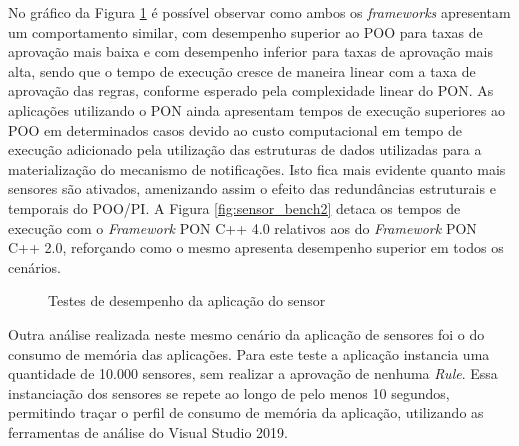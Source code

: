 No gráfico da Figura \ref{fig:sensor_bench} é possível observar como ambos os
\textit{frameworks} apresentam um comportamento similar, com desempenho superior
ao POO para taxas de aprovação mais baixa e com desempenho inferior para taxas
de aprovação mais alta, sendo que o tempo de execução cresce de maneira linear
com a taxa de aprovação das regras, conforme esperado pela complexidade linear
do PON. As aplicações utilizando o PON ainda apresentam tempos de execução
superiores ao POO em determinados casos devido ao custo computacional em tempo
de execução adicionado pela utilização das estruturas de dados utilizadas para a
materialização do mecanismo de notificações. Isto fica mais evidente quanto mais
sensores são ativados, amenizando assim o efeito das redundâncias estruturais e
temporais do POO/PI. A Figura \ref{fig:sensor_bench2} detaca os tempos de
execução com o \textit{Framework} PON C++ 4.0 relativos aos do
\textit{Framework} PON C++ 2.0, reforçando como o mesmo apresenta desempenho
superior em todos os cenários.

\begin{figure}[!htb]
\centering
{}
\caption{Testes de desempenho da aplicação do sensor}
\label{fig:sensor_bench}
\end{figure}

Outra análise realizada neste mesmo cenário da aplicação de sensores foi o do
consumo de memória das aplicações. Para este teste a aplicação instancia uma
quantidade de 10.000 sensores, sem realizar a aprovação de nenhuma \textit{Rule}.
Essa instanciação dos sensores se repete ao longo de pelo menos 10 segundos,
permitindo traçar o perfil de consumo de memória da aplicação, utilizando as
ferramentas de análise do Visual Studio 2019.

